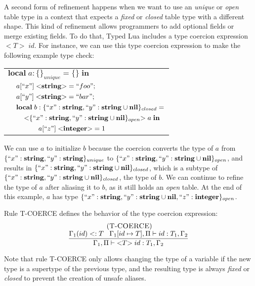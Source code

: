 \documentclass[preprint]{sigplanconf}
\newcommand{\Nil}{\mathbf{nil}}
\newcommand{\Integer}{\mathbf{integer}}
\newcommand{\String}{\mathbf{string}}
\newcommand{\mylabel}[1]{\; (\textsc{#1})}
\newcommand{\env}{\Gamma}
\newcommand{\penv}{\Pi}
\newcommand{\subtype}{<:}
\begin{document}
A second form of refinement happens when we want to use an
\emph{unique} or \emph{open} table type in a context that expects a
\emph{fixed} or \emph{closed} table type with a different shape.
This kind of refinement allows programmers to add optional fields
or merge existing fields.
To do that, Typed Lua includes a type coercion expression ${<}T{>} \; id$.
For instance, we can use this type coercion expression to make the following
example type check:
\begin{center}
\begin{tabular}{llll}
\multicolumn{4}{l}{$\mathbf{local} \; a:\{\}_{unique} = \{ \} \; \mathbf{in}$}\\
& \multicolumn{3}{l}{$a[``x"] \; {<}\String{>} = ``foo";$}\\
& \multicolumn{3}{l}{$a[``y"] \; {<}\String{>} = ``bar";$}\\
& \multicolumn{3}{l}{$\mathbf{local} \; b:\{``x":\String, ``y":\String \cup \Nil \}_{closed} =$}\\
& & \multicolumn{2}{l}{${<}\{``x":\String, ``y":\String \cup \Nil\}_{open}{>} \; a \; \mathbf{in}$}\\
& & & \multicolumn{1}{l}{$a[``z"] \; {<}\Integer{>} = 1$}
\end{tabular}
\end{center}

We can use $a$ to initialize $b$ because the coercion converts
the type of $a$ from $\{``x":\String, ``y":\String\}_{unique}$ to
$\{``x":\String, ``y":\String \cup \Nil\}_{open}$, and results in
$\{``x":\String, ``y":\String \cup \Nil\}_{closed}$,
which is a subtype of
$\{``x":\String, ``y":\String \cup \Nil\}_{closed}$, the type of $b$.
We can continue to refine the type of $a$ after aliasing it to $b$,
as it still holds an \emph{open} table.
At the end of this example, $a$ has type
$\{``x":\String, ``y":\String \cup \Nil, ``z":\Integer\}_{open}$.

Rule \textsc{T-COERCE} defines the behavior of the type coercion expression:
\[
\begin{array}{c}
\mylabel{T-COERCE}\\
\dfrac{\env_{1}(id) \subtype T \;\;\;
       \env_{1}[id \mapsto T], \penv \vdash id:T_{1}, \env_{2}}
      {\env_{1}, \penv \vdash {<}T{>} \; id:T_{1}, \env_{2}}
\end{array}
\]

Note that rule \textsc{T-COERCE} only allows changing the type
of a variable if the new type is a supertype of the previous type,
and the resulting type is always \emph{fixed} or \emph{closed}
to prevent the creation of unsafe aliases.
\end{document}
